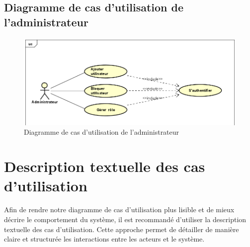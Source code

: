 \subsection{Diagramme de cas d’utilisation de l'administrateur}
\begin{figure}[htbp]
    \centering
    \includegraphics[scale=0.55]{Images/admin.png} %
    \caption{Diagramme de cas d’utilisation de l'administrateur}
    \label{fig:UCAdmin}
\end{figure}
\vspace{1cm}

\section{Description textuelle des cas d'utilisation}

Afin de rendre notre diagramme de cas d’utilisation plus lisible et 
de mieux décrire le comportement du système, il est recommandé 
d'utiliser la description textuelle des cas d’utilisation. 
Cette approche permet de détailler de manière claire et structurée 
les interactions entre les acteurs et le système.

